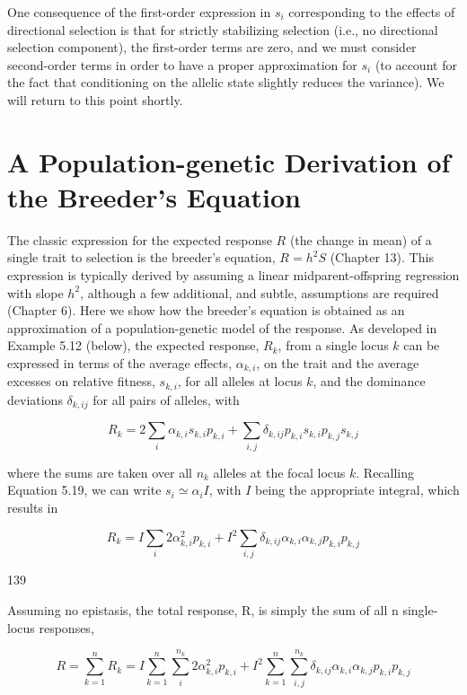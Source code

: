 \documentclass{article}
\begin{document}
One consequence of the first-order expression in  $ s_i $ corresponding to the effects of directional selection is that for strictly stabilizing selection (i.e., no directional selection component), the first-order terms are zero, and we must consider second-order terms in order to have a proper approximation for  $ s_i $ (to account for the fact that conditioning on the allelic state slightly reduces the variance). We will return to this point shortly.

\section{A Population-genetic Derivation of the Breeder's Equation}
The classic expression for the expected response  $ R $ (the change in mean) of a single trait to selection is the breeder's equation,  $ R = h^2 S $ (Chapter 13). This expression is typically derived by assuming a linear midparent-offspring regression with slope  $ h^2 $, although a few additional, and subtle, assumptions are required (Chapter 6). Here we show how the breeder's equation is obtained as an approximation of a population-genetic model of the response. As developed in Example 5.12 (below), the expected response,  $ R_k $, from a single locus  $ k $ can be expressed in terms of the average effects,  $ \alpha_{k,i} $, on the trait and the average excesses on relative fitness,  $ s_{k,i} $, for all alleles at locus  $ k $, and the dominance deviations  $ \delta_{k,ij} $ for all pairs of alleles, with

\begin{equation}
R_{k}=2\sum_{i}\alpha_{k,i}s_{k,i}p_{k,i}+\sum_{i,j}\delta_{k,ij}p_{k,i}s_{k,i}p_{k,j}s_{k,j}
\tag{5.22}
\label{eq:5_22}
\end{equation}

where the sums are taken over all  $ n_k $ alleles at the focal locus  $ k $. Recalling Equation 5.19, we can write  $ s_i \simeq \alpha_i I $, with  $ I $ being the appropriate integral, which results in

\begin{equation}
R_{k}=I\sum_{i}2\alpha_{k,i}^{2}p_{k,i}+I^{2}\sum_{i,j}\delta_{k,ij}\alpha_{k,i}\alpha_{k,j}p_{k,i}p_{k,j}
\tag{5.23a}
\label{eq:5_23a}
\end{equation}

139

Assuming no epistasis, the total response, R, is simply the sum of all n single-locus responses,

\begin{equation}
R=\sum_{k=1}^{n}R_{k}=I\sum_{k=1}^{n}\sum_{i}^{n_{k}}2\alpha_{k,i}^{2}p_{k,i}+I^{2}\sum_{k=1}^{n}\sum_{i,j}^{n_{k}}\delta_{k,ij}\alpha_{k,i}\alpha_{k,j}p_{k,i}p_{k,j}
\tag{5.23b}
\label{eq:5_23b}
\end{equation}
\end{document}
